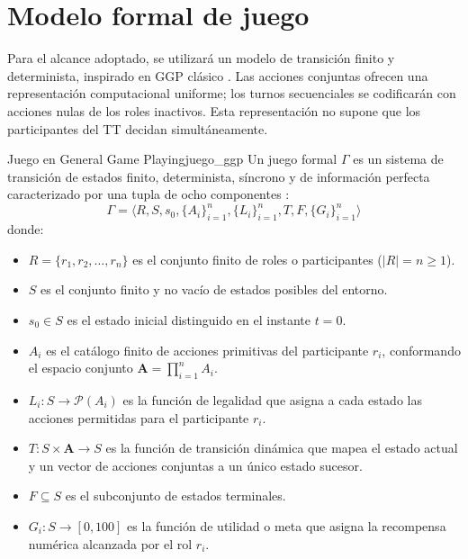 \section{Modelo formal de juego}
\label{sec:modelo_formal_juego}

Para el alcance adoptado, se utilizará un modelo de transición finito y determinista, inspirado en GGP clásico \cite{Genesereth2005GGP, GeneserethThielscher2014, Love2008GDL}. Las acciones conjuntas ofrecen una representación computacional uniforme; los turnos secuenciales se codificarán con acciones nulas de los roles inactivos. Esta representación no supone que los participantes del TT decidan simultáneamente.

\begin{definicion}{Juego en General Game Playing}{juego_ggp}
Un juego formal $\Gamma$ es un sistema de transición de estados finito, determinista, síncrono y de información perfecta caracterizado por una tupla de ocho componentes \cite{Genesereth2005GGP, Love2008GDL, GeneserethThielscher2014}:
\begin{equation*}
    \Gamma = \langle R, S, s_0, \{A_i\}_{i=1}^n, \{L_i\}_{i=1}^n, T, F, \{G_i\}_{i=1}^n \rangle
\end{equation*}
donde:
\begin{itemize}
    \item $R = \{r_1, r_2, \dots, r_n\}$ es el conjunto finito de roles o participantes ($|R| = n \ge 1$).
    \item $S$ es el conjunto finito y no vacío de estados posibles del entorno.
    \item $s_0 \in S$ es el estado inicial distinguido en el instante $t = 0$.
    \item $A_i$ es el catálogo finito de acciones primitivas del participante $r_i$, conformando el espacio conjunto $\mathbf{A} = \prod_{i=1}^n A_i$.
    \item $L_i : S \to \mathcal{P}(A_i)$ es la función de legalidad que asigna a cada estado las acciones permitidas para el participante $r_i$.
    \item $T : S \times \mathbf{A} \to S$ es la función de transición dinámica que mapea el estado actual y un vector de acciones conjuntas a un único estado sucesor.
    \item $F \subseteq S$ es el subconjunto de estados terminales.
    \item $G_i : S \to [0, 100]$ es la función de utilidad o meta que asigna la recompensa numérica alcanzada por el rol $r_i$.
\end{itemize}
\end{definicion}

